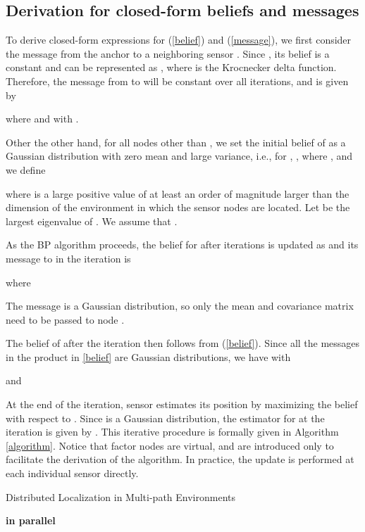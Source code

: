 \documentclass[10pt, twocolumn, final]{IEEEtran}
\begin{document}
\subsection{Derivation for closed-form beliefs and messages}\label{Subsection:Derivation}
To derive closed-form expressions for (\ref{belief}) and (\ref{message}), we first consider the message from the anchor  to a neighboring sensor . Since , its belief is a constant and can be represented as , where  is the Krocnecker delta function. Therefore, the message from  to  will be constant over all iterations, and is given by

where  and  with .

Other the other hand, for all nodes  other than , we set the initial belief of  as a Gaussian distribution with zero mean and large variance, i.e., for , , where , and we define

where  is a large positive value of at least an order of magnitude larger than the dimension of the environment in which the sensor nodes are located. Let  be the largest eigenvalue of . We assume that .

As the BP algorithm proceeds, the belief  for  after  iterations is updated as  and its message to  in the  iteration is

where

The message  is a Gaussian distribution, so only the mean  and covariance matrix  need to be passed to node .

The belief of  after the  iteration then follows from (\ref{belief}). Since all the messages in the product in \eqref{belief} are Gaussian distributions, we have  with

and

At the end of the  iteration, sensor  estimates its position by maximizing the belief  with respect to . Since  is a Gaussian distribution, the estimator for  at the  iteration is given by . This iterative procedure is formally given in Algorithm \ref{algorithm}. Notice that factor nodes are virtual, and are introduced only to facilitate the derivation of the algorithm. In practice, the update is performed at each individual sensor directly.

\begin{algorithm}[!t]
\caption{Distributed Localization in Multi-path Environments} \label{algorithm}
\begin{algorithmic}[1]
 \textbf{in parallel}
\ENDFOR
\end{algorithmic}
\end{algorithm}
\end{document}
